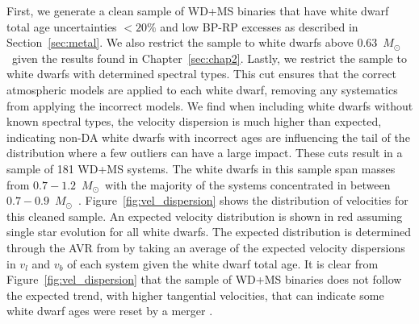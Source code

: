 \documentclass[twocolumn,linenumbers]{aastex631}
\newcommand{\msun}{$M_{\odot}$}
\begin{document}
First, we generate a clean sample of WD+MS binaries that have white dwarf total age uncertainties $<20\%$ and low BP-RP excesses as described in Section~\ref{sec:metal}. We also restrict the sample to white dwarfs above 0.63~\msun\ given the results found in Chapter~\ref{sec:chap2}. Lastly, we restrict the sample to white dwarfs with determined spectral types. This cut ensures that the correct atmospheric models are applied to each white dwarf, removing any systematics from applying the incorrect models. We find when including white dwarfs without known spectral types, the velocity dispersion is much higher than expected, indicating non-DA white dwarfs with incorrect ages are influencing the tail of the distribution where a few outliers can have a large impact. These cuts result in a sample of 181 WD+MS systems. The white dwarfs in this sample span masses from $0.7-1.2$~\msun\ with the majority of the systems concentrated in between $0.7-0.9$~\msun\ . Figure~\ref{fig:vel_dispersion} shows the distribution of velocities for this cleaned sample. An expected velocity distribution is shown in red assuming single star evolution for all white dwarfs. The expected distribution is determined through the AVR from \cite{2019ApJ...886..100C} by taking an average of the expected velocity dispersions in $v_l$ and $v_b$ of each system given the white dwarf total age. It is clear from Figure~\ref{fig:vel_dispersion} that the sample of WD+MS binaries does not follow the expected trend, with higher tangential velocities, that can indicate some white dwarf ages were reset by a merger \citep{2020ApJ...891..160C}.

\end{document}
